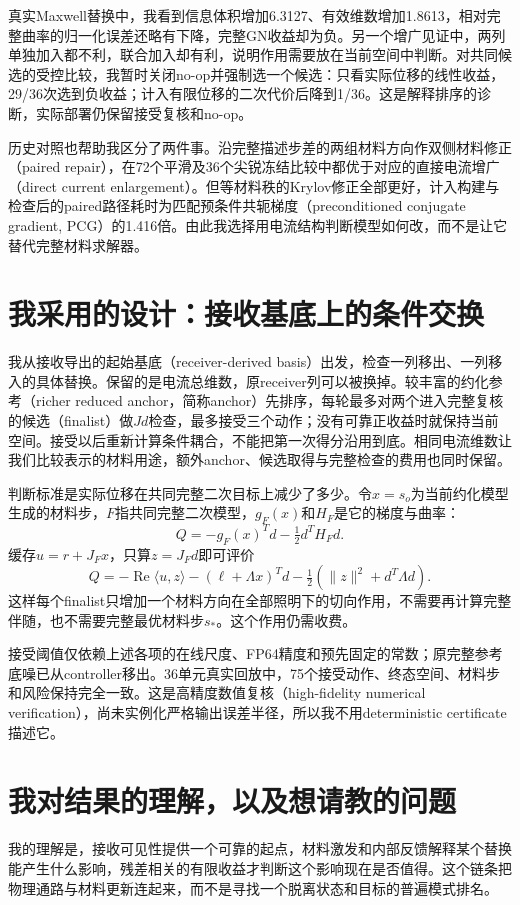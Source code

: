 \documentclass[UTF8,a4paper,11pt,fontset=none]{ctexart}
\begin{document}
真实Maxwell替换中，我看到信息体积增加6.3127、有效维数增加1.8613，相对完整曲率的归一化误差还略有下降，完整GN收益却为负。另一个增广见证中，两列单独加入都不利，联合加入却有利，说明作用需要放在当前空间中判断。对共同候选的受控比较，我暂时关闭no-op并强制选一个候选：只看实际位移的线性收益，29/36次选到负收益；计入有限位移的二次代价后降到1/36。这是解释排序的诊断，实际部署仍保留接受复核和no-op。

历史对照也帮助我区分了两件事。沿完整描述步差的两组材料方向作双侧材料修正（paired repair），在72个平滑及36个尖锐冻结比较中都优于对应的直接电流增广（direct current enlargement）。但等材料秩的Krylov修正全部更好，计入构建与检查后的paired路径耗时为匹配预条件共轭梯度（preconditioned conjugate gradient, PCG）的1.416倍。由此我选择用电流结构判断模型如何改，而不是让它替代完整材料求解器。

\section{我采用的设计：接收基底上的条件交换}
我从接收导出的起始基底（receiver-derived basis）出发，检查一列移出、一列移入的具体替换。保留的是电流总维数，原receiver列可以被换掉。较丰富的约化参考（richer reduced anchor，简称anchor）先排序，每轮最多对两个进入完整复核的候选（finalist）做$Jd$检查，最多接受三个动作；没有可靠正收益时就保持当前空间。接受以后重新计算条件耦合，不能把第一次得分沿用到底。相同电流维数让我们比较表示的材料用途，额外anchor、候选取得与完整检查的费用也同时保留。

判断标准是实际位移在共同完整二次目标上减少了多少。令$x=s_o$为当前约化模型生成的材料步，$F$指共同完整二次模型，$g_F(x)$和$H_F$是它的梯度与曲率：
\[
Q=-g_F(x)^Td-\tfrac12d^TH_Fd.
\]
缓存$u=r+J_Fx$，只算$z=J_Fd$即可评价
\[
Q=-\operatorname{Re}\langle u,z\rangle-(\ell+\Lambda x)^Td
-\tfrac12(\|z\|^2+d^T\Lambda d).
\]
这样每个finalist只增加一个材料方向在全部照明下的切向作用，不需要再计算完整伴随，也不需要完整最优材料步$s_*$。这个作用仍需收费。

接受阈值仅依赖上述各项的在线尺度、FP64精度和预先固定的常数；原完整参考底噪已从controller移出。36单元真实回放中，75个接受动作、终态空间、材料步和风险保持完全一致。这是高精度数值复核（high-fidelity numerical verification），尚未实例化严格输出误差半径，所以我不用deterministic certificate描述它。



\section{我对结果的理解，以及想请教的问题}
我的理解是，接收可见性提供一个可靠的起点，材料激发和内部反馈解释某个替换能产生什么影响，残差相关的有限收益才判断这个影响现在是否值得。这个链条把物理通路与材料更新连起来，而不是寻找一个脱离状态和目标的普遍模式排名。
\end{document}

